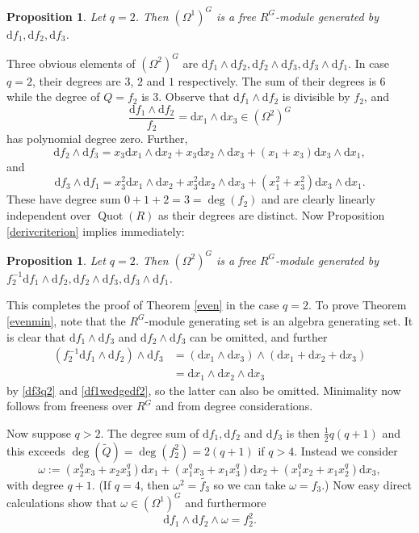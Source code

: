 \documentclass[a4paper]{amsart}
\newcommand{\dd}{\mathrm{d}}
\def\Quot{\operatorname{Quot}}
\newtheorem{prop}[Lemma]{Proposition}
\newtheorem*{Corollary of Conjecture}{Corollary of Conjecture}
\theoremstyle{definition}
\theoremstyle{remark}
\theoremstyle{Acknowledgments}
\begin{document}
\begin{prop}
Let $q=2$. Then $(\Omega^1)^G$ is a free $R^G$-module generated by $\dd f_1, \dd f_2, \dd f_3$.
\end{prop}

Three obvious elements of $(\Omega^2)^G$ are $\dd f_1 \wedge \dd f_2, \dd f_2 \wedge \dd f_3, \dd f_3 \wedge \dd f_1$. In case $q=2$, their degrees are $3$, $2$ and $1$ respectively. The sum of their degrees is 6 while the degree of $Q=f_2$ is 3. Observe that $\dd f_1 \wedge \dd f_2$ is divisible by $f_2$, and
\begin{equation}\label{df1wedgedf2} \frac{\dd f_1 \wedge \dd f_2}{f_2} = \dd x_1 \wedge \dd x_3 \in (\Omega^2)^G \end{equation}  has polynomial degree zero. Further,
$$ \dd f_2 \wedge \dd f_3 = x_3 \dd x_1 \wedge \dd x_2 + x_3 \dd x_2 \wedge \dd x_3 + (x_1+x_3)\dd x_3 \wedge \dd x_1,$$ 
and
$$ \dd f_3 \wedge \dd f_1 = x^2_3 \dd x_1 \wedge \dd x_2 + x^2_3 \dd x_2 \wedge \dd x_3 + (x^2_1+x^2_3)\dd x_3 \wedge \dd x_1.$$ 
These have degree sum $0+1+2 = 3 = \deg(f_2)$ and are clearly linearly independent over $\Quot(R)$ as their degrees are distinct. Now Proposition \ref{derivcriterion} implies immediately:

\begin{prop}
Let $q=2$. Then $(\Omega^2)^G$ is a free $R^G$-module generated by $f_2^{-1} \dd f_1 \wedge \dd f_2, \dd f_2 \wedge \dd f_3, \dd f_3 \wedge \dd f_1$.
\end{prop}

This completes the proof of Theorem \ref{even} in the case $q=2$. To prove Theorem \ref{evenmin}, note that the $R^G$-module generating set is an algebra generating set. It is clear that $\dd f_1 \wedge \dd f_3$ and $\dd f_2 \wedge \dd f_3$ can be omitted, and further 
\begin{align*} (f_2^{-1}\dd f_1 \wedge \dd f_2) \wedge \dd f_3  &= (\dd x_1 \wedge \dd x_3) \wedge (\dd x_1+\dd x_2 + \dd x_3) \\
&= \dd x_1 \wedge \dd x_2 \wedge \dd x_3 \end{align*}
by \eqref{df3q2} and \eqref{df1wedgedf2}, so the latter can also be omitted. Minimality now follows from freeness over $R^G$ and from degree considerations.

Now suppose $q>2$. The degree sum of $\dd f_1, \dd f_2$ and $\dd f_3$ is then $\frac12 q(q+1)$ and this exceeds $\deg(\tilde{Q}) = \deg(f_2^2) = 2(q+1)$ if $q>4$. Instead we consider
\[\omega:= (x_2^qx_3+x_2x_3^q)\dd x_1+  (x_1^qx_3+x_1x_3^q)\dd x_2 + (x_1^qx_2+x_1x_2^q)\dd x_3,\]
with degree $q+1$. (If $q=4$, then $\omega^2 = \tilde{f_3}$ so we can take $\omega=f_3$.) Now easy direct calculations show that $\omega \in (\Omega^1)^G$ and furthermore
\[\dd f_1 \wedge \dd f_2 \wedge \omega = f_2^2.\]
\end{document}
